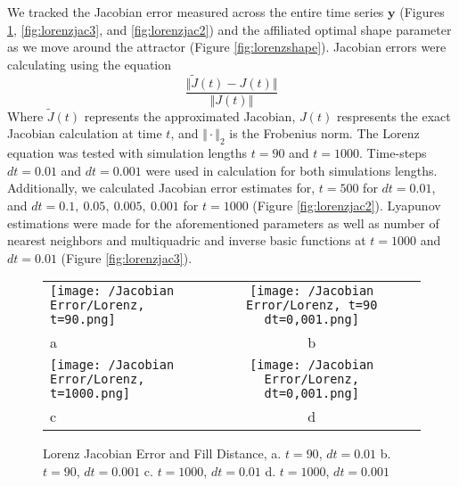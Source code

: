                 We tracked the Jacobian error measured across the entire time series $\mathbf{y}$ (Figures \ref{fig:lorenzjac}, \ref{fig:lorenzjac3}, and \ref{fig:lorenzjac2}) and the
                affiliated optimal shape parameter as we move around the attractor (Figure \ref{fig:lorenzshape}).
                Jacobian errors were calculating using the equation
                \begin{equation}
                    \frac{\Vert \tilde{J}(t)-J(t) \Vert}{\Vert J(t) \Vert}
                \end{equation}
                Where $\tilde{J}(t)$ represents the approximated Jacobian, $J(t)$ respresents the exact Jacobian calculation at time $t$,
                and $\Vert\cdot\Vert_2$ is the Frobenius norm. The Lorenz equation was tested with simulation lengths $t=90$ and $t=1000$. Time-steps $dt=0.01$ and
                $dt=0.001$ were used in calculation for both simulations lengths. Additionally,
                we calculated Jacobian error estimates for, $t=500$ for $dt=0.01$, and $dt=0.1, \ 0.05, \ 0.005, \ 0.001$ for $t=1000$ (Figure \ref{fig:lorenzjac2}).
                Lyapunov estimations were made for the aforementioned parameters as well as number of nearest neighbors and
                multiquadric and inverse basic functions at $t=1000$ and $dt=0.01$ (Figure \ref{fig:lorenzjac3}).\\
            \begin{figure}[H]
                \centering
                \begin{tabular}{lcc}
                    \texttt{[image: /Jacobian Error/Lorenz, t=90.png]}&
                    \texttt{[image: /Jacobian Error/Lorenz, t=90 dt=0,001.png]}\\
                    \hfil a &b\\
                    \texttt{[image: /Jacobian Error/Lorenz, t=1000.png]}&
                    \texttt{[image: /Jacobian Error/Lorenz, dt=0,001.png]}\\
                    \hfil c &d\\
                \end{tabular}
                \caption{Lorenz Jacobian Error and Fill Distance, a. $t=90$, $dt=0.01$ b. $t=90$, $dt=0.001$ c. $t=1000$, $dt=0.01$ d. $t=1000$, $dt=0.001$}\label{fig:lorenzjac}
            \end{figure}
